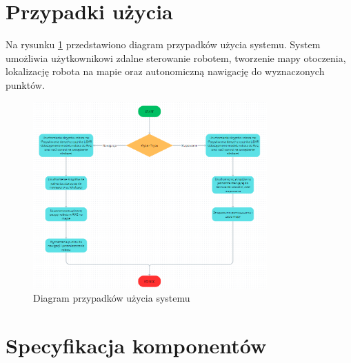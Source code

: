\documentclass[a4paper,twoside,12pt]{book}
\begin{document}
\section{Przypadki użycia}
Na rysunku \ref{fig:use-case} przedstawiono diagram przypadków użycia systemu. System umożliwia użytkownikowi zdalne sterowanie robotem, tworzenie mapy otoczenia, lokalizację robota na mapie oraz autonomiczną nawigację do wyznaczonych punktów. 
\begin{figure}[h]
\centering
\includegraphics[width=0.8\textwidth]{images/UML.png}
\caption{Diagram przypadków użycia systemu}
\label{fig:use-case}
\end{figure}
\newpage
\section{Specyfikacja komponentów}
\end{document}
